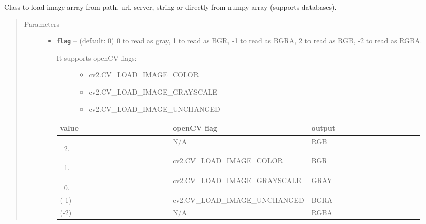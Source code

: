 \documentclass[letterpaper,10pt,english]{sphinxmanual}
\begin{document}
\begin{fulllineitems}
\label{RRtoolbox.lib:RRtoolbox.lib.image.imLoader}
Class to load image array from path, url,
server, string or directly from numpy array (supports databases).
\begin{quote}\begin{description}
\item[{Parameters}] \leavevmode\begin{itemize}
\item {} 
\textbf{\texttt{flag}} -- 
(default: 0) 0 to read as gray, 1 to read as BGR, -1 to
read as BGRA, 2 to read as RGB, -2 to read as RGBA.
\begin{description}
\item[{It supports openCV flags:}] \leavevmode\begin{itemize}
\item {} 
cv2.CV\_LOAD\_IMAGE\_COLOR

\item {} 
cv2.CV\_LOAD\_IMAGE\_GRAYSCALE

\item {} 
cv2.CV\_LOAD\_IMAGE\_UNCHANGED

\end{itemize}

\end{description}

\begin{tabular}{|p{0.317\linewidth}|p{0.317\linewidth}|p{0.317\linewidth}|}
\hline
\textsf{\relax 
value
} & \textsf{\relax 
openCV flag
} & \textsf{\relax 
output
}\\
\hline\begin{enumerate}
\setcounter{enumi}{1}
\item {} 
\end{enumerate}
 & 
N/A
 & 
RGB
\\
\hline\begin{enumerate}
\item {} 
\end{enumerate}
 & 
cv2.CV\_LOAD\_IMAGE\_COLOR
 & 
BGR
\\
\hline\begin{enumerate}
\setcounter{enumi}{-1}
\item {} 
\end{enumerate}
 & 
cv2.CV\_LOAD\_IMAGE\_GRAYSCALE
 & 
GRAY
\\
\hline
(-1)
 & 
cv2.CV\_LOAD\_IMAGE\_UNCHANGED
 & 
BGRA
\\
\hline
(-2)
 & 
N/A
 & 
RGBA
\\
\hline\end{tabular}




\end{itemize}
\end{description}
\end{quote}
\end{fulllineitems}
\end{document}
